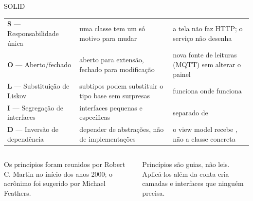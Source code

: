 \documentclass[aspectratio=169,10pt]{beamer}
\begin{document}
\begin{frame}{SOLID}
  \scriptsize
  \begin{tabularx}{\textwidth}{@{}p{3.6cm} L L@{}}
    \toprule
     &  &  \\
    \midrule
    \textbf{S} --- Responsabilidade única & uma classe tem um só motivo para mudar & a tela não faz HTTP; o serviço não desenha \\
    \textbf{O} --- Aberto/fechado & aberto para extensão, fechado para modificação & nova fonte de leituras (MQTT) sem alterar o painel \\
    \textbf{L} --- Substituição de Liskov & subtipos podem substituir o tipo base sem surpresas &  funciona onde  funciona \\
    \textbf{I} --- Segregação de interfaces & interfaces pequenas e específicas &  separado de  \\
    \textbf{D} --- Inversão de dependência & depender de abstrações, não de implementações & o view model recebe , não a classe concreta \\
    \bottomrule
  \end{tabularx}
  \vspace{4pt}
  \begin{columns}[T]
    \begin{column}{0.48\textwidth}
      \begin{historia}
        Os princípios foram reunidos por Robert C. Martin no início dos anos 2000; o acrônimo foi sugerido por Michael Feathers.
      \end{historia}
    \end{column}
    \begin{column}{0.48\textwidth}
      \begin{atencao}
        Princípios são guias, não leis. Aplicá-los além da conta cria camadas e interfaces que ninguém precisa.
      \end{atencao}
    \end{column}
  \end{columns}
\end{frame}
\end{document}
